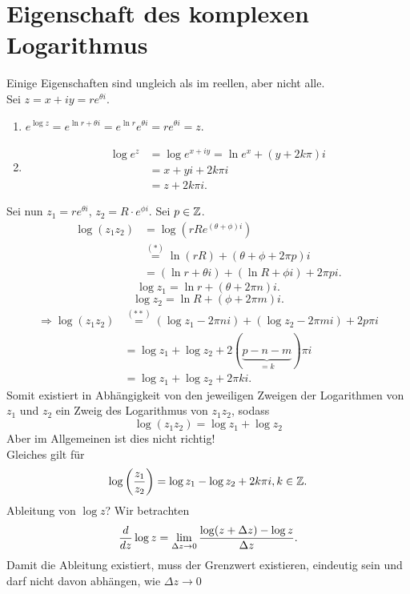 \documentclass[../ana2u.tex]{subfiles}
\begin{document}
\section{Eigenschaft des komplexen Logarithmus}
Einige Eigenschaften sind ungleich als im reellen, aber 
nicht alle.\\
Sei \( z = x + iy = re^{\theta i} \).
\begin{enumerate}
    \item \( e^{\log z} = e^{\ln r + \theta i} 
    = e^{\ln r}e^{\theta i} = re^{\theta i} = z \).
    \item 
        \begin{align*}
            \log e^z &= \log e^{x+iy} = \ln e^x + (y + 2k\pi)i \\
            &= x + yi + 2k \pi i\\
            &= z + 2k \pi i.
        \end{align*}
\end{enumerate}
Sei nun \( z_1 = r e^{\theta i} \), 
\( z_2 = R \cdot e^{\phi i} \).
Sei \( p\in\mathbb{Z} \).
\begin{align*}
    \log(z_1 z_2) &= \log(rR e^{(\theta + \phi)i}) \\
    &\overset{(*)}{=} \ln(rR) + (\theta + \phi + 2\pi p)i \\
    &= (\ln r + \theta i) + (\ln R + \phi i) + 2\pi p i. \tag{\(**\)}
\end{align*}
\[ \log z_1 = \ln r + (\theta + 2\pi n)i. \]
\[ \log z_2 = \ln R + (\phi + 2\pi m)i. \]
\begin{align*}
    \Rightarrow \log (z_1 z_2) &\overset{(**)}{=} 
    (\log z_1 - 2\pi ni) + (\log z_2 - 2\pi m i) + 2p\pi i \\
    &= \log z_1 + \log z_2 + 2(\underbrace{p-n-m}_{= k}) \pi i\\    
    &= \log z_1 + \log z_2 + 2\pi k i.
\end{align*}
Somit existiert in Abhängigkeit von den 
jeweiligen Zweigen der 
Logarithmen von \(z_1\) und \(z_2\) ein Zweig des Logarithmus
von \(z_1 z_2 \), sodass
\[ \log (z_1z_2) = \log z_1 + \log z_2 \]
Aber im Allgemeinen ist dies nicht richtig! \\
Gleiches gilt für
\[ \log \left( \frac{z_1}{z_2} \right)
= \log z_1 - \log z_2 + 2k\pi i, k \in \mathbb{Z}. \]
Ableitung von \( \log z \)?
Wir betrachten 
\[ \frac{d}{dz} \log z 
= \lim\limits_{\Delta z\rightarrow{}0} 
\frac{\log(z+\Delta z) - \log z}{\Delta z}. \]
Damit die Ableitung existiert, muss der 
Grenzwert existieren, eindeutig sein und darf
nicht davon abhängen, wie \( \Delta z \rightarrow 0 \)
\end{document}
